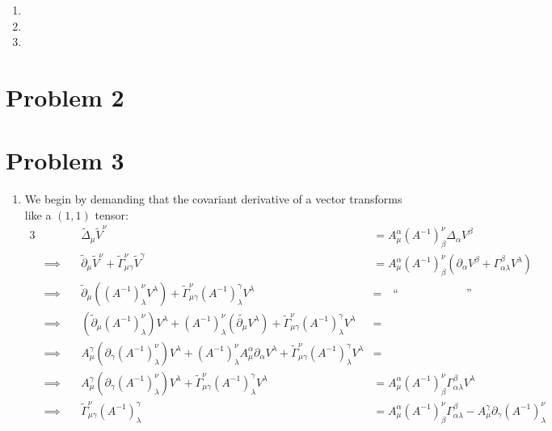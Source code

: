 \documentclass[12pt]{article}
\newcommand{\chrissym}[3]{\Gamma_{#2#3}^#1}
\newcommand{\tchrissym}[3]{\tilde{\Gamma}_{#2#3}^#1}
\begin{document}
\begin{enumerate}[label=(\alph*)]
    \item

    \item

    \item
\end{enumerate}

\section*{Problem 2}


\section*{Problem 3}
\begin{enumerate}[label=(\alph*)]
    \item We begin by demanding that the covariant derivative of a vector transforms like a $(1,1)$ tensor:
    \begin{alignat*}{3}
        &         \quad & \tilde{\Delta}_\mu\tilde{V}^\nu &= A_\mu^\alpha (A^{-1})_\beta^\nu\Delta_\alpha V^\beta \\
        &\implies \quad & \tilde{\partial}_\mu\tilde{V}^\nu + \tchrissym{\nu}{\mu}{\gamma}\tilde{V}^\gamma &= A_\mu^\alpha (A^{-1})_\beta^\nu\left(\partial_\alpha V^\beta + \chrissym{\beta}{\alpha}{\lambda}V^\lambda\right) \\
        &\implies \quad & \tilde{\partial}_\mu\left((A^{-1})_\lambda^\nu V^\lambda\right) + \tchrissym{\nu}{\mu}{\gamma}(A^{-1})_\lambda^\gamma V^\lambda &= \quad \text{``}\qquad\qquad\qquad\text{''}\quad\\
        &\implies \quad & (\tilde{\partial}_\mu (A^{-1})_\lambda^\nu) V^\lambda + (A^{-1})_\lambda^\nu (\tilde{\partial_\mu}V^\lambda) + \tchrissym{\nu}{\mu}{\gamma}(A^{-1})_\lambda^\gamma V^\lambda &= \\
        &\implies \quad & A_\mu^\gamma(\partial_\gamma(A^{-1})_\lambda^\nu)V^\lambda + (A^{-1})_\lambda^\nu A_\mu^\alpha\partial_\alpha V^\lambda + \tchrissym{\nu}{\mu}{\gamma}(A^{-1})_\lambda^\gamma V^\lambda &= \\
        &\implies \quad & A_\mu^\gamma(\partial_\gamma(A^{-1})_\lambda^\nu)V^\lambda + \tchrissym{\nu}{\mu}{\gamma}(A^{-1})_\lambda^\gamma V^\lambda &= A_\mu^\alpha (A^{-1})_\beta^\nu\chrissym{\beta}{\alpha}{\lambda}V^\lambda \\
        &\implies \quad & \tchrissym{\nu}{\mu}{\gamma}(A^{-1})_\lambda^\gamma &= A_\mu^\alpha (A^{-1})_\beta^\nu\chrissym{\beta}{\alpha}{\lambda} - A_\mu^\gamma\partial_\gamma(A^{-1})_\lambda^\nu \\

\end{alignat*}
\end{enumerate}
\end{document}
